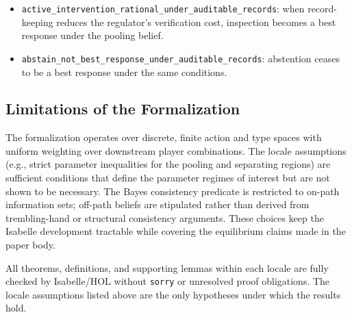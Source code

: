 \begin{itemize}
      \begin{itemize}
        \item \texttt{active\_\allowbreak{}intervention\_\allowbreak{}rational\_\allowbreak{}under\_\allowbreak{}auditable\_\allowbreak{}records}: when record-keeping reduces the regulator's verification cost, inspection becomes a best response under the pooling belief.
        \item \texttt{abstain\_\allowbreak{}not\_\allowbreak{}best\_\allowbreak{}response\_\allowbreak{}under\_\allowbreak{}auditable\_\allowbreak{}records}: abstention ceases to be a best response under the same conditions.
      \end{itemize}
\end{itemize}

\subsection*{Limitations of the Formalization}

The formalization operates over discrete, finite action and type spaces with uniform weighting over downstream player combinations. The locale assumptions (e.g., strict parameter inequalities for the pooling and separating regions) are sufficient conditions that define the parameter regimes of interest but are not shown to be necessary. The Bayes consistency predicate is restricted to on-path information sets; off-path beliefs are stipulated rather than derived from trembling-hand or structural consistency arguments. These choices keep the Isabelle development tractable while covering the equilibrium claims made in the paper body.

All theorems, definitions, and supporting lemmas within each locale are fully checked by Isabelle/HOL without \texttt{sorry} or unresolved proof obligations. The locale assumptions listed above are the only hypotheses under which the results hold.
